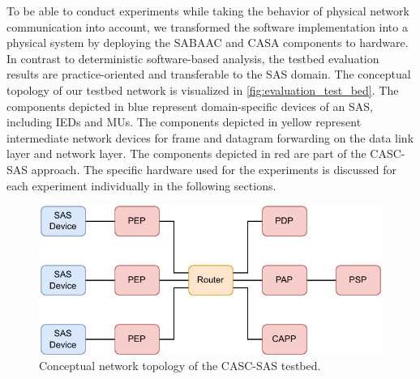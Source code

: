 To be able to conduct experiments while taking the behavior of physical network communication into account, we transformed the software implementation into a physical system by deploying the SABAAC and CASA components to hardware.
In contrast to deterministic software-based analysis, the testbed evaluation results are practice-oriented and transferable to the SAS domain.
The conceptual topology of our testbed network is visualized in \autoref{fig:evaluation_test_bed}.
The components depicted in blue represent domain-specific devices of an SAS, including IEDs and MUs.
The components depicted in yellow represent intermediate network devices for frame and datagram forwarding on the data link layer and network layer.
The components depicted in red are part of the CASC-SAS approach.
The specific hardware used for the experiments is discussed for each experiment individually in the following sections.
\begin{figure}
    \centering
    \includegraphics[width=0.8\linewidth]{figures/network_testbed_color.drawio.pdf}
    \caption{Conceptual network topology of the CASC-SAS testbed.}
    \label{fig:evaluation_test_bed}
\end{figure}
%

